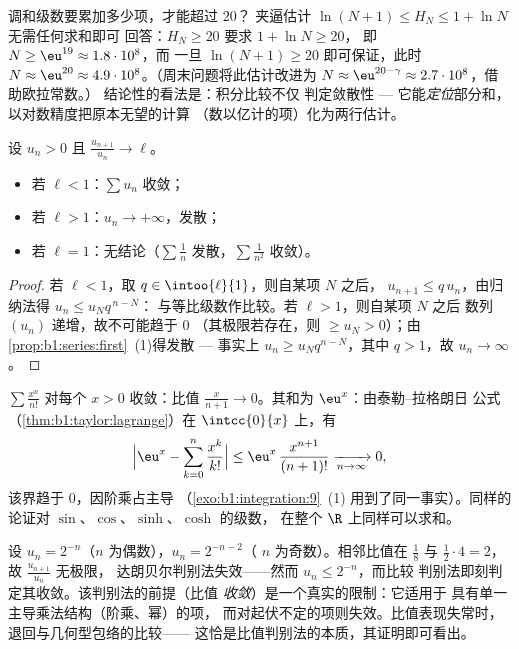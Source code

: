 \begin{example}[调和级数的累加]\label{ex:b1:series:harmonicstack}
调和级数要累加多少项，才能超过 $20$？
夹逼估计 $\ln(N+1) \leq H_N \leq 1 + \ln N$ 无需任何求和即可
回答：$H_N \geq 20$ 要求 $1 + \ln N \geq 20$，
即 $N \geq \eu^{19} \approx 1.8\cdot10^{8}$，而
一旦 $\ln(N + 1) \geq 20$ 即可保证，此时 $N \approx \eu^{20} \approx
4.9\cdot10^{8}$。（周末问题将此估计改进为 $N \approx
\eu^{20 - \gamma} \approx 2.7\cdot10^{8}$，借助欧拉常数。）
结论性的看法是：积分比较不仅
判定敛散性 --- 它能\emph{定位}部分和，
以对数精度把原本无望的计算
（数以亿计的项）化为两行估计。
\end{example}

\begin{theorem}\label{thm:b1:series:ratio}
设 $u_n > 0$ 且 $\frac{u_{n+1}}{u_n} \to \ell$。
\begin{itemize}
  \item 若 $\ell < 1$：$\sum u_n$ 收敛；
  \item 若 $\ell > 1$：$u_n \to +\infty$，发散；
  \item 若 $\ell = 1$：无结论（$\sum \frac1n$ 发散，$\sum
        \frac{1}{n^2}$ 收敛）。
\end{itemize}
\end{theorem}

\begin{proof}
若 $\ell < 1$，取 $q \in \intoo{\ell}{1}$，则自某项 $N$ 之后，
$u_{n+1} \leq q\,u_n$，由归纳法得 $u_n \leq u_N q^{\,n-N}$：
与等比级数作比较。若 $\ell > 1$，则自某项 $N$ 之后
数列 $(u_n)$ 递增，故不可能趋于 $0$
（其极限若存在，则 $\geq u_N > 0$）；由
\cref{prop:b1:series:first}~(1)得发散 --- 事实上 $u_n
\geq u_N q^{n-N}$，其中 $q > 1$，故 $u_n \to \infty$。
\end{proof}

\begin{example}\label{ex:b1:series:ratio}
$\sum \frac{x^n}{n!}$ 对每个 $x > 0$ 收敛：比值
$\frac{x}{n+1} \to 0$。其和为 $\eu^x$：由泰勒–拉格朗日
公式（\cref{thm:b1:taylor:lagrange}）在 $\intcc{0}{x}$ 上，有
\[
\Bigl| \eu^x - \sum_{k=0}^{n} \frac{x^k}{k!} \Bigr|
\leq \eu^{x}\, \frac{x^{n+1}}{(n+1)!} \xrightarrow[n\to\infty]{} 0 ,
\]
该界趋于 $0$，因阶乘占主导
（\cref{exo:b1:integration:9}~(1) 用到了同一事实）。同样的
论证对 $\sin$、$\cos$、$\sinh$、$\cosh$ 的级数，
在整个 $\R$ 上同样可以求和。
\end{example}

\begin{example}\label{ex:b1:series:rationotnecessary}
设 $u_n = 2^{-n}$（$n$ 为偶数），$u_n = 2^{-n-2}$（
$n$ 为奇数）。相邻比值在 $\frac{1}{8}$ 与
$\frac12\cdot4 = 2$，故 $\frac{u_{n+1}}{u_n}$ 无极限，
达朗贝尔判别法失效——然而 $u_n \leq 2^{-n}$，而比较
判别法即刻判定其收敛。该判别法的前提（比值
\emph{收敛}）是一个真实的限制：它适用于
具有单一主导乘法结构（阶乘、幂）的项，
而对起伏不定的项则失效。比值表现失常时，
退回与几何型包络的比较——
这恰是比值判别法的本质，其证明即可看出。
\end{example}

